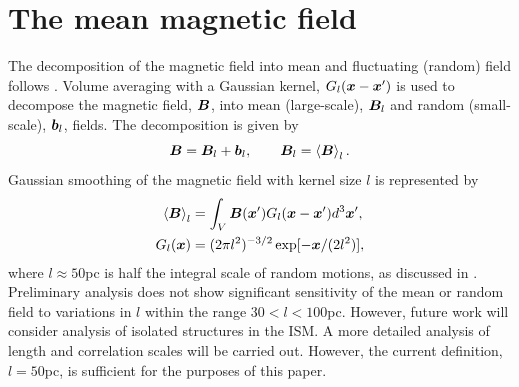 \documentclass[useAMS,usenatbib]{mn2e}
\begin{document}
\section{The mean magnetic field}

The decomposition of the magnetic field into mean and fluctuating (random) 
field follows \MHD.
Volume averaging with a Gaussian kernel, $G_{l}(\boldsymbol{x}-\boldsymbol{x}')$ is used to decompose the magnetic field, $\boldsymbol{B}$, into mean (large-scale), $\boldsymbol{B}_{l}$ and random (small-scale), $\boldsymbol{b}_{l}$, fields. The decomposition is given by 
\begin{equation}
\boldsymbol{B} = \boldsymbol{B}_{l}+\boldsymbol{b}_{l},\qquad \boldsymbol{B}_{l} = \left<\boldsymbol{B}\right>_{l}. \label{decomp} 
\end{equation}
Gaussian smoothing of the magnetic field with kernel size $l$ is represented by
\begin{align}
\left<\boldsymbol{B}\right>_{l}&=\int_{V}\boldsymbol{B}(\boldsymbol{x}')G_{l}(\boldsymbol{x}-\boldsymbol{x}')d^{3}\boldsymbol{x}',\\
G_{l}(\boldsymbol{x})&=(2\pi l^2)^{-3/2}\exp[-\boldsymbol{x}/(2l^2)],\nonumber
\label{gauss}
\end{align} 
where $l\approx50$pc is half the integral scale of random motions, as discussed
in \HD.  
Preliminary analysis does not show significant sensitivity of the mean or random field to variations in $l$ within the range $30<l<100$pc. However, future work will consider analysis of isolated structures in the ISM. A more detailed analysis of length and correlation scales will be carried out. However, the current definition, $l=50$pc, is sufficient for the purposes of this paper. 
\end{document}
